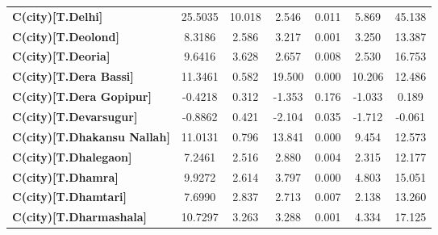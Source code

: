 \begin{center}
\begin{tabular}{lcccccc}
\textbf{C(city)[T.Delhi]}                                                                           &      25.5035  &       10.018     &     2.546  &         0.011        &        5.869    &       45.138     \\
\textbf{C(city)[T.Deolond]}                                                                         &       8.3186  &        2.586     &     3.217  &         0.001        &        3.250    &       13.387     \\
\textbf{C(city)[T.Deoria]}                                                                          &       9.6416  &        3.628     &     2.657  &         0.008        &        2.530    &       16.753     \\
\textbf{C(city)[T.Dera Bassi]}                                                                      &      11.3461  &        0.582     &    19.500  &         0.000        &       10.206    &       12.486     \\
\textbf{C(city)[T.Dera Gopipur]}                                                                    &      -0.4218  &        0.312     &    -1.353  &         0.176        &       -1.033    &        0.189     \\
\textbf{C(city)[T.Devarsugur]}                                                                      &      -0.8862  &        0.421     &    -2.104  &         0.035        &       -1.712    &       -0.061     \\
\textbf{C(city)[T.Dhakansu Nallah]}                                                                 &      11.0131  &        0.796     &    13.841  &         0.000        &        9.454    &       12.573     \\
\textbf{C(city)[T.Dhalegaon]}                                                                       &       7.2461  &        2.516     &     2.880  &         0.004        &        2.315    &       12.177     \\
\textbf{C(city)[T.Dhamra]}                                                                          &       9.9272  &        2.614     &     3.797  &         0.000        &        4.803    &       15.051     \\
\textbf{C(city)[T.Dhamtari]}                                                                        &       7.6990  &        2.837     &     2.713  &         0.007        &        2.138    &       13.260     \\
\textbf{C(city)[T.Dharmashala]}                                                                     &      10.7297  &        3.263     &     3.288  &         0.001        &        4.334    &       17.125     \\

\end{tabular}
\end{center}
